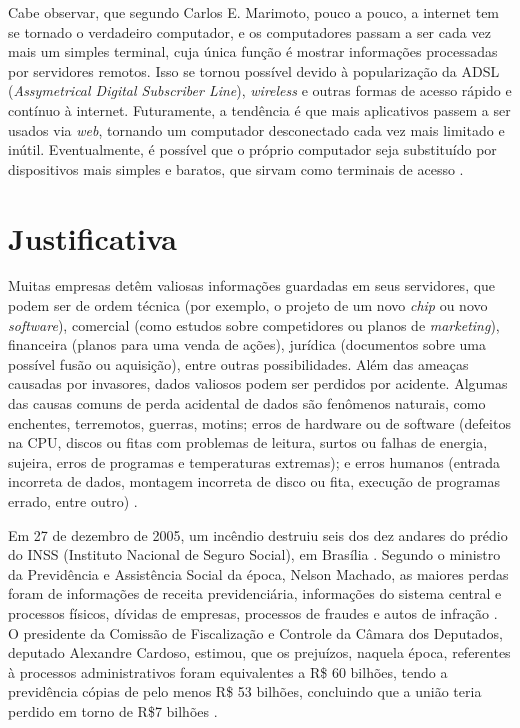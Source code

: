 Cabe observar, que segundo Carlos E. Marimoto, pouco a pouco, a internet tem se tornado o verdadeiro computador, e os computadores passam a ser cada vez mais um simples terminal, cuja única função é mostrar informações processadas por servidores remotos. Isso se tornou possível devido à popularização da ADSL (\textit{Assymetrical Digital Subscriber Line}), \textit{wireless} e outras formas de acesso rápido e contínuo à internet. Futuramente, a tendência é que mais aplicativos passem a ser usados via \textit{web}, tornando um computador desconectado cada vez mais limitado e inútil. Eventualmente, é possível que o próprio computador seja substituído por dispositivos mais simples e baratos, que sirvam como terminais de acesso \cite{Marimoto:2011}.

\section{Justificativa}

Muitas empresas detêm valiosas informações guardadas em seus servidores, que podem ser de ordem técnica (por exemplo, o projeto de um novo \textit{chip} ou novo \textit{software}), comercial (como estudos sobre competidores ou planos de \textit{marketing}), financeira (planos para uma venda de ações), jurídica (documentos sobre uma possível fusão ou aquisição), entre outras possibilidades. Além das ameaças causadas por invasores, dados valiosos podem ser perdidos por acidente. Algumas das causas comuns de perda acidental de dados são fenômenos naturais, como enchentes, terremotos, guerras, motins; erros de hardware ou de software (defeitos na CPU, discos ou fitas com problemas de leitura, surtos ou falhas de energia, sujeira,  erros de programas e temperaturas extremas); e erros humanos (entrada incorreta de dados, montagem incorreta de disco ou fita, execução de programas errado, entre outro) \cite{Tanenbaum:2010,Silberschatz:2000}.


Em 27 de dezembro de 2005, um incêndio destruiu seis dos dez andares do  prédio do INSS (Instituto Nacional de Seguro Social), em  Brasília \cite{Laudo:2006}. Segundo o ministro da Previdência e Assistência Social da época, Nelson Machado, as maiores perdas foram de informações de receita previdenciária, informações do sistema central e processos físicos, dívidas de empresas, processos de fraudes e autos de infração \cite{Machado:2005}. O presidente da Comissão de Fiscalização e Controle da Câmara dos Deputados, deputado Alexandre Cardoso, estimou, que os prejuízos, naquela época, referentes à processos administrativos foram equivalentes a R\$ 60 bilhões, tendo a previdência cópias de pelo menos R\$ 53 bilhões, concluindo que a união teria perdido em torno de R\$7 bilhões \cite{Futema:2005}.


